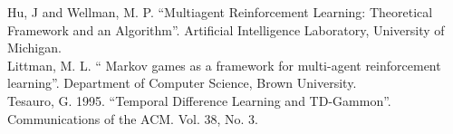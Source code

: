 \documentclass[letterpaper]{article}
\begin{document}
Hu, J and Wellman, M. P. ``Multiagent Reinforcement Learning: Theoretical Framework and an Algorithm''. Artificial Intelligence Laboratory, University of Michigan.\\

Littman, M. L. `` Markov games as a framework for multi-agent reinforcement learning''. Department of Computer Science, Brown University.\\

Tesauro, G. 1995. ``Temporal Difference Learning and TD-Gammon''. Communications of the ACM. Vol. 38, No. 3.
\end{document}
